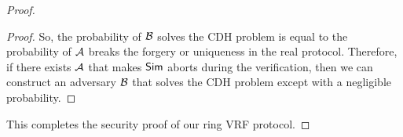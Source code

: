 \begin{proof}
\begin{proof}
			So, the probability of $ \mathcal{B} $ solves the CDH problem is equal to the probability of $ \mathcal{A} $ breaks the forgery or uniqueness in the real protocol. Therefore,  if there exists $ \mathcal{A} $ that makes $ \mathsf{Sim}$ aborts during the verification, then we can construct an adversary $ \mathcal{B} $ that solves the CDH problem except with a negligible probability.
			
			
				  
		\end{proof}
		This completes the security proof of our ring VRF protocol.
	\end{proof}

